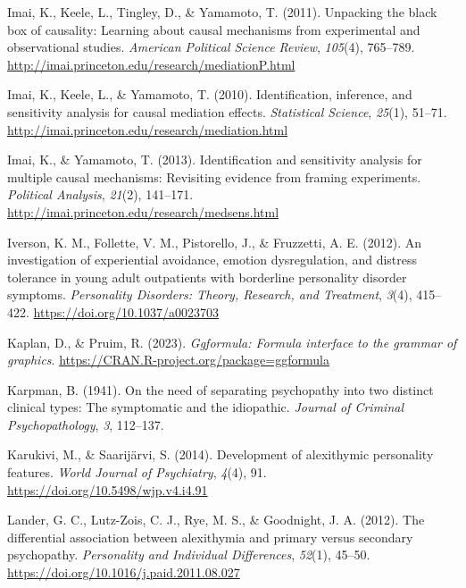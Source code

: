 \documentclass[
  man,floatsintext]{apa7}
\newlength{\cslhangindent}
\newlength{\cslentryspacingunit} %
\newenvironment{CSLReferences}[2] %
 {%
  \setlength{\parindent}{0pt}
  \ifodd #1
  \let\oldpar\par
  \def\par{\hangindent=\cslhangindent\oldpar}
  \fi
  \setlength{\parskip}{#2\cslentryspacingunit}
 }%
 {}
\begin{document}
\begin{CSLReferences}{1}{0}
\leavevmode{}%
Imai, K., Keele, L., Tingley, D., \& Yamamoto, T. (2011). Unpacking the black box of causality: Learning about causal mechanisms from experimental and observational studies. \emph{American Political Science Review}, \emph{105}(4), 765--789. \url{http://imai.princeton.edu/research/mediationP.html}

\leavevmode{}%
Imai, K., Keele, L., \& Yamamoto, T. (2010). Identification, inference, and sensitivity analysis for causal mediation effects. \emph{Statistical Science}, \emph{25}(1), 51--71. \url{http://imai.princeton.edu/research/mediation.html}

\leavevmode{}%
Imai, K., \& Yamamoto, T. (2013). Identification and sensitivity analysis for multiple causal mechanisms: Revisiting evidence from framing experiments. \emph{Political Analysis}, \emph{21}(2), 141--171. \url{http://imai.princeton.edu/research/medsens.html}

\leavevmode{}%
Iverson, K. M., Follette, V. M., Pistorello, J., \& Fruzzetti, A. E. (2012). An investigation of experiential avoidance, emotion dysregulation, and distress tolerance in young adult outpatients with borderline personality disorder symptoms. \emph{Personality Disorders: Theory, Research, and Treatment}, \emph{3}(4), 415--422. \url{https://doi.org/10.1037/a0023703}

\leavevmode{}%
Kaplan, D., \& Pruim, R. (2023). \emph{Ggformula: Formula interface to the grammar of graphics}. \url{https://CRAN.R-project.org/package=ggformula}

\leavevmode{}%
Karpman, B. (1941). On the need of separating psychopathy into two distinct clinical types: The symptomatic and the idiopathic. \emph{Journal of Criminal Psychopathology}, \emph{3}, 112--137.

\leavevmode{}%
Karukivi, M., \& Saarijärvi, S. (2014). Development of alexithymic personality features. \emph{World Journal of Psychiatry}, \emph{4}(4), 91. \url{https://doi.org/10.5498/wjp.v4.i4.91}

\leavevmode{}%
Lander, G. C., Lutz-Zois, C. J., Rye, M. S., \& Goodnight, J. A. (2012). The differential association between alexithymia and primary versus secondary psychopathy. \emph{Personality and Individual Differences}, \emph{52}(1), 45--50. \url{https://doi.org/10.1016/j.paid.2011.08.027}


\end{CSLReferences}
\end{document}
